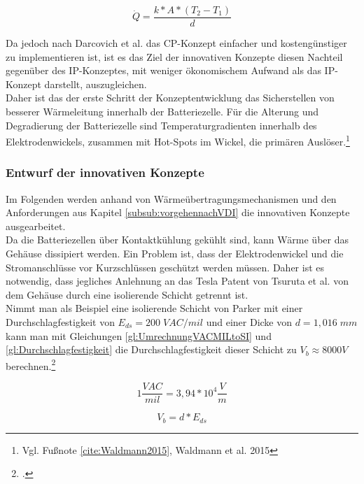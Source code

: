 \begin{equation}
	\dot{Q} = \frac{k * A * ( T_{2} - T_{1})}{d}
	\label{gl:HeatTransferEquationInnovativ}
\end{equation}

Da jedoch nach Darcovich et al. das CP-Konzept einfacher und kostengünstiger zu implementieren ist, ist es das Ziel der innovativen Konzepte diesen Nachteil gegenüber des IP-Konzeptes, mit weniger ökonomischem Aufwand als das IP-Konzept darstellt, auszugleichen.\\
Daher ist das der erste Schritt der Konzeptentwicklung das Sicherstellen von besserer Wärmeleitung innerhalb der Batteriezelle. Für die Alterung und Degradierung der Batteriezelle sind Temperaturgradienten innerhalb des Elektrodenwickels, zusammen mit Hot-Spots im Wickel, die primären Auslöser.\footnote{Vgl. Fußnote \ref{cite:Waldmann2015}, Waldmann et al. 2015}\\

\subsubsection*{Entwurf der innovativen Konzepte}

Im Folgenden werden anhand von Wärmeübertragungsmechanismen und den Anforderungen aus Kapitel \ref{subsub:vorgehennachVDI} die innovativen Konzepte ausgearbeitet.\\
Da die Batteriezellen über Kontaktkühlung gekühlt sind, kann Wärme über das Gehäuse dissipiert werden. Ein Problem ist, dass der Elektrodenwickel und die Stromanschlüsse vor Kurzschlüssen geschützt werden müssen. Daher ist es notwendig, dass jegliches Anlehnung an das Tesla Patent von Tsuruta et al. von dem Gehäuse durch eine isolierende Schicht getrennt ist.\\
Nimmt man als Beispiel eine isolierende Schicht von Parker\textsuperscript{\textregistered} mit einer Durchschlagfestigkeit von $E_{ds} = 200\;VAC/mil$ und einer Dicke von $d = 1,016\;mm$ kann man mit Gleichungen \ref{gl:UmrechnungVACMILtoSI} und \ref{gl:Durchschlagfestigkeit} die Durchschlagfestigkeit dieser Schicht zu $V_{b} \approx 8000 V$ berechnen.\footcite[Vgl.\label{cite:ParkerPads}][]{Parker.2021}

\begin{equation}
	1 \frac{VAC}{mil} = 3,94 * 10^{4} \frac{V}{m}
	\label{gl:UmrechnungVACMILtoSI}
\end{equation}

\begin{equation}
	V_{b} = d * E_{ds}
	\label{gl:Durchschlagfestigkeit}
\end{equation}

